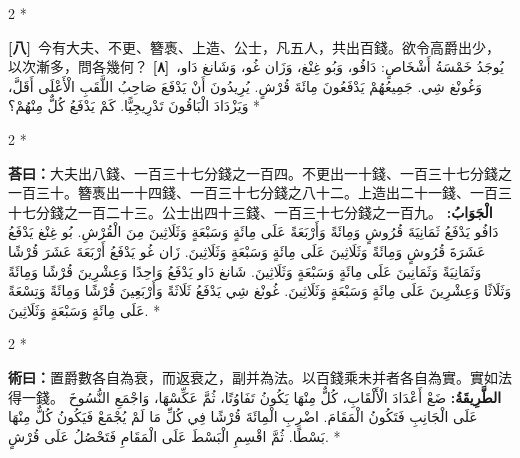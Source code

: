 \documentclass[11pt,a4paper]{article}
\newcommand{\ar}[1]{\arabicfont\beginR #1\endR}
\newcommand{\problemnum}[1]{\textbf{[\ignorespaces#1\unskip]}}
\newenvironment{bilingual}{%
  \begin{paracol}{2}%
  \switchcolumn[0]*%
}{%
  \end{paracol}%
}
\newcommand{\cnline}[1]{\switchcolumn[0]\noindent #1 \switchcolumn[1]}
\newcommand{\arline}[1]{\noindent\ar{#1} \switchcolumn[0]*}
\newenvironment{prob bilingual}{%
  \begin{paracol}{2}%
  \switchcolumn[0]*%
}{%
  \end{paracol}%
  \vspace{0.3em}%
}
\begin{document}
\begin{bilingual}
\cnline{\problemnum{八}\, 今有大夫、不更、簪褭、上造、公士，凡五人，共出百錢。欲令高爵出少，以次漸多，問各幾何？}
\arline{\problemnum{٨}\, يُوجَدُ خَمْسَةُ أَشْخَاصٍ: دَافُو، وَبُو غِنْغ، وَزَان غُو، وَشَانغ دَاو، وَغُونْغ شِي. جَمِيعُهُمْ يَدْفَعُونَ مِائَةَ قُرْشٍ. يُرِيدُونَ أَنْ يَدْفَعَ صَاحِبُ اللَّقَبِ الْأَعْلَى أَقَلَّ، وَيَزْدَادَ الْبَاقُونَ تَدْرِيجِيًّا. كَمْ يَدْفَعُ كُلٌّ مِنْهُمْ؟}
\end{bilingual}

\begin{bilingual}
\cnline{\textcolor{answercolor}{\textbf{荅曰：}}大夫出八錢、一百三十七分錢之一百四。不更出一十錢、一百三十七分錢之一百三十。簪褭出一十四錢、一百三十七分錢之八十二。上造出二十一錢、一百三十七分錢之一百二十三。公士出四十三錢、一百三十七分錢之一百九。}
\arline{\textcolor{answercolor}{\textbf{الْجَوَابُ:}} دَافُو يَدْفَعُ ثَمَانِيَةَ قُرُوشٍ وَمِائَةً وَأَرْبَعَةً عَلَى مِائَةٍ وَسَبْعَةٍ وَثَلَاثِينَ مِنَ الْقُرْشِ. بُو غِنْغ يَدْفَعُ عَشَرَةَ قُرُوشٍ وَمِائَةً وَثَلَاثِينَ عَلَى مِائَةٍ وَسَبْعَةٍ وَثَلَاثِينَ. زَان غُو يَدْفَعُ أَرْبَعَةَ عَشَرَ قُرْشًا وَثَمَانِيَةً وَثَمَانِينَ عَلَى مِائَةٍ وَسَبْعَةٍ وَثَلَاثِينَ. شَانغ دَاو يَدْفَعُ وَاحِدًا وَعِشْرِينَ قُرْشًا وَمِائَةً وَثَلَاثًا وَعِشْرِينَ عَلَى مِائَةٍ وَسَبْعَةٍ وَثَلَاثِينَ. غُونْغ شِي يَدْفَعُ ثَلَاثَةً وَأَرْبَعِينَ قُرْشًا وَمِائَةً وَتِسْعَةً عَلَى مِائَةٍ وَسَبْعَةٍ وَثَلَاثِينَ.}
\end{bilingual}

\begin{bilingual}
\cnline{%
\textcolor{methodcolor}{\textbf{術曰：}}置爵數各自為衰，而返衰之，副并為法。以百錢乘未并者各自為實。實如法得一錢。
}
\arline{%
\textcolor{methodcolor}{\textbf{الطَّرِيقَةُ:}} ضَعْ أَعْدَادَ الْأَلْقَابِ، كُلٌّ مِنْهَا يَكُونُ تَفَاوُتًا، ثُمَّ عَكِّسْهَا، وَاجْمَعِ النُّسُوخَ عَلَى الْجَانِبِ فَتَكُونُ الْمَقَامَ. اضْرِبِ الْمِائَةَ قُرْشًا فِي كُلِّ مَا لَمْ يُجْمَعْ فَيَكُونُ كُلٌّ مِنْهَا بَسْطًا. ثُمَّ اقْسِمِ الْبَسْطَ عَلَى الْمَقَامِ فَتَحْصُلُ عَلَى قُرْشٍ.
}
\end{bilingual}
\end{document}
